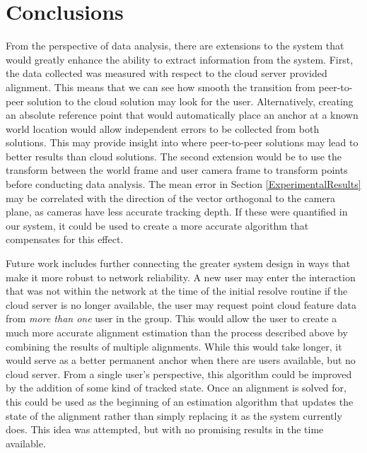 \documentclass{vgtc}                          %
\begin{document}


\section{Conclusions}

From the perspective of data analysis, there are extensions to the system that would greatly enhance the 
ability to extract information from the system. First, the data collected was measured with respect to the cloud server provided 
alignment. This means that we can see how smooth the transition from peer-to-peer solution to the cloud solution may look 
for the user. Alternatively, creating an absolute reference point that would automatically place an anchor at a known world location would 
allow independent errors to be collected from both solutions. This may provide insight into where peer-to-peer solutions 
may lead to better results than cloud solutions. The second extension would be to use the transform between the world frame and 
user camera frame to transform points before conducting data analysis. The mean error in Section \ref{ExperimentalResults} may be correlated 
with the direction of the vector orthogonal to the camera plane, as cameras have less accurate tracking depth. If these were quantified in our 
system, it could be used to create a more accurate algorithm that compensates for this effect.

Future work includes further connecting the greater system design in ways that make it more 
robust to network reliability. A new user may enter the interaction that was not within the network
at the time of the initial resolve routine if the cloud server is no longer available, the user may request 
point cloud feature data from \textit{more than one} user in the group. This would allow the user to create a 
much more accurate alignment estimation than the process described above by combining the results of multiple
alignments. While this would take longer, it would serve as a better permanent anchor when there are users
available, but no cloud server. From a single user's perspective, this algorithm could be improved by 
the addition of some kind of tracked state. Once an alignment is solved for, this could be used as the beginning 
of an estimation algorithm that updates the state of the alignment rather than simply replacing it as 
the system currently does. This idea was attempted, but with no promising results in the time available.
\end{document}
